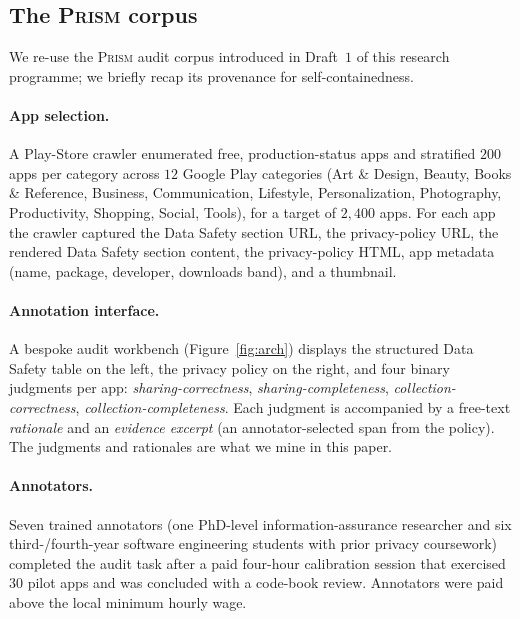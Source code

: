 \documentclass[11pt,a4paper]{article}
\newcommand{\prism}{\textsc{Prism}}
\begin{document}
\subsection{The \prism{} corpus}\label{sec:corpus}
We re-use the \prism{} audit corpus introduced in Draft~$1$ of
this research programme; we briefly recap its provenance for
self-containedness.

\paragraph{App selection.} A Play-Store crawler enumerated free,
production-status apps and stratified $200$ apps per category across
$12$ Google Play categories (Art \& Design, Beauty, Books \&
Reference, Business, Communication, Lifestyle, Personalization,
Photography, Productivity, Shopping, Social, Tools), for a target of
$2{,}400$ apps. For each app the crawler captured the Data Safety
section URL, the privacy-policy URL, the rendered Data Safety section
content, the privacy-policy HTML, app metadata (name, package,
developer, downloads band), and a thumbnail.

\paragraph{Annotation interface.} A bespoke audit workbench
(Figure~\ref{fig:arch}) displays the structured Data Safety table on the
left, the privacy policy on the right, and four binary judgments per
app: \emph{sharing-correctness}, \emph{sharing-completeness},
\emph{collection-correctness}, \emph{collection-completeness}. Each
judgment is accompanied by a free-text \emph{rationale} and an
\emph{evidence excerpt} (an annotator-selected span from the policy).
The judgments and rationales are what we mine in this paper.

\paragraph{Annotators.} Seven trained annotators (one PhD-level
information-assurance researcher and six third-/fourth-year software
engineering students with prior privacy coursework) completed the
audit task after a paid four-hour calibration session that exercised
$30$ pilot apps and was concluded with a code-book review. Annotators
were paid above the local minimum hourly wage.
\end{document}
